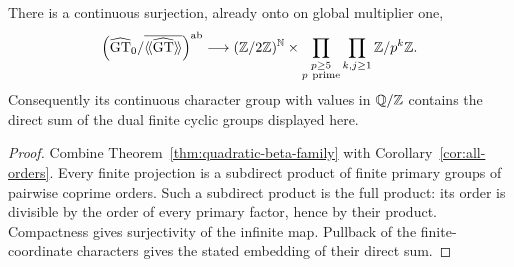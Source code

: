 \begin{corollary}
\label{cor:simultaneous-quotient}
There is a continuous surjection, already onto on global multiplier one,
\[
 \left(\widehat{\mathrm{GT}}_0/\overline{\langle\!\langle\widehat{\mathrm{GT}}\rangle\!\rangle}\right)^{\mathrm{ab}}
 \longrightarrow
 (\mathbb Z/2\mathbb Z)^{\mathbb N}\times
 \prod_{\substack{p\geq5\\p\ \mathrm{prime}}}
       \prod_{k,j\geq1}\mathbb Z/p^k\mathbb Z.
\]
Consequently its continuous character group with values in $\mathbb Q/\mathbb Z$
contains the direct sum of the dual finite cyclic groups displayed here.
\end{corollary}
\begin{proof}
Combine Theorem~\ref{thm:quadratic-beta-family} with
Corollary~\ref{cor:all-orders}.  Every finite projection is a subdirect
product of finite primary groups of pairwise coprime orders.  Such a
subdirect product is the full product: its order is divisible by the
order of every primary factor, hence by their product.  Compactness gives
surjectivity of the infinite map.  Pullback of the finite-coordinate
characters gives the stated embedding of their direct sum.
\end{proof}
